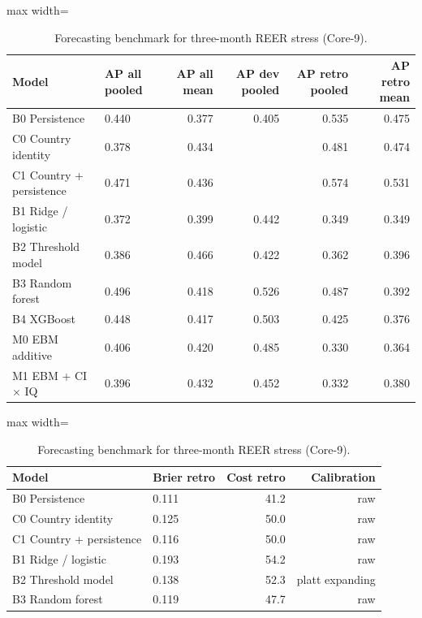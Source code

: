 \documentclass[preprint,12pt,authoryear]{elsarticle}
\begin{document}
\begin{table}[!htbp]
\centering
\scriptsize
\setlength{\tabcolsep}{3pt}
\caption{Forecasting benchmark for three-month REER stress (Core-9).}
\label{tab:bench}
\par{}\par\smallskip
\begin{adjustbox}{max width=\textwidth}
\begin{tabular}{llrrrr}
\toprule
Model & AP all pooled & AP all mean & AP dev pooled & AP retro pooled & AP retro mean \\
\midrule
B0 Persistence & 0.440 & 0.377 & 0.405 & 0.535 & 0.475 \\
C0 Country identity & 0.378 & 0.434 &  & 0.481 & 0.474 \\
C1 Country + persistence & 0.471 & 0.436 &  & 0.574 & 0.531 \\
B1 Ridge / logistic & 0.372 & 0.399 & 0.442 & 0.349 & 0.349 \\
B2 Threshold model & 0.386 & 0.466 & 0.422 & 0.362 & 0.396 \\
B3 Random forest & 0.496 & 0.418 & 0.526 & 0.487 & 0.392 \\
B4 XGBoost & 0.448 & 0.417 & 0.503 & 0.425 & 0.376 \\
M0 EBM additive & 0.406 & 0.420 & 0.485 & 0.330 & 0.364 \\
M1 EBM + CI $\times$ IQ & 0.396 & 0.432 & 0.452 & 0.332 & 0.380 \\
\bottomrule
\end{tabular}
\end{adjustbox}
\par{}\par\smallskip
\begin{adjustbox}{max width=\textwidth}
\begin{tabular}{llrr}
\toprule
Model & Brier retro & Cost retro & Calibration \\
\midrule
B0 Persistence & 0.111 & 41.2 & raw \\
C0 Country identity & 0.125 & 50.0 & raw \\
C1 Country + persistence & 0.116 & 50.0 & raw \\
B1 Ridge / logistic & 0.193 & 54.2 & raw \\
B2 Threshold model & 0.138 & 52.3 & platt expanding \\
B3 Random forest & 0.119 & 47.7 & raw \\

\end{tabular}
\end{adjustbox}
\end{table}
\end{document}
